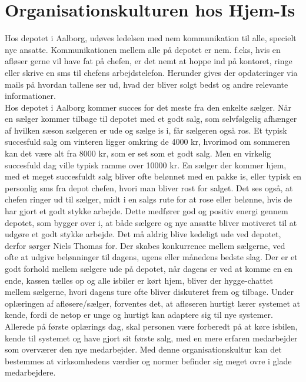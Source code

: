 \section{Organisationskulturen hos Hjem-Is}
Hos depotet i Aalborg, udøves ledelsen med nem kommunikation til alle, specielt nye ansatte. Kommunikationen mellem alle på depotet er nem. f.eks, hvis en afløser gerne vil have fat på chefen, er det nemt at hoppe ind på kontoret, ringe eller skrive en sms til chefens arbejdstelefon. Herunder gives der opdateringer via mails på hvordan tallene ser ud, hvad der bliver solgt bedst og andre relevante informationer. \\
Hos depotet i Aalborg kommer succes for det meste fra den enkelte sælger. Når en sælger kommer tilbage til depotet med et godt salg, som selvfølgelig afhænger af hvilken sæson sælgeren er ude og sælge is i, får sælgeren også ros. Et typisk succesfuld salg om vinteren ligger omkring de 4000 kr, hvorimod om sommeren kan det være alt fra 8000 kr, som er set som et godt salg. Men en virkelig succesfuld dag ville typisk ramme over 10000 kr. En sælger der kommer hjem, med et meget succesfuldt salg bliver ofte belønnet med en pakke is, eller typisk en personlig sms fra depot chefen, hvori man bliver rost for salget. Det ses også, at chefen ringer ud til sælger, midt i en salgs rute for at rose eller belønne, hvis de har gjort et godt stykke arbejde. Dette medfører god og positiv energi gennem depotet, som bygger over i, at både sælgere og nye ansatte bliver motiveret til at udgøre et godt stykke arbejde. Det må aldrig blive kedeligt ude ved depotet, derfor sørger Niels Thomas for. Der skabes konkurrence mellem sælgerne, ved ofte at udgive belønninger til dagens, ugens eller månedens bedste slag. Der er et godt forhold mellem sælgere ude på depotet, når dagens er ved at komme en en ende, kassen tælles op og alle isbiler er kørt hjem, bliver der hygge-chattet mellem sælgerne, hvori dagens ture ofte bliver diskuteret frem og tilbage. Under oplæringen af afløsere/sælger, forventes det, at afløseren hurtigt lærer systemet at kende, fordi de netop er unge og hurtigt kan adaptere sig til nye systemer. Allerede på første oplærings dag, skal personen være forberedt på at køre isbilen, kende til systemet og have gjort sit første salg, med en mere erfaren medarbejder som overværer den nye medarbejder. Med denne organisationskultur kan det bestemmes at virksomhedens værdier og normer befinder sig meget ovre i glade medarbejdere.

